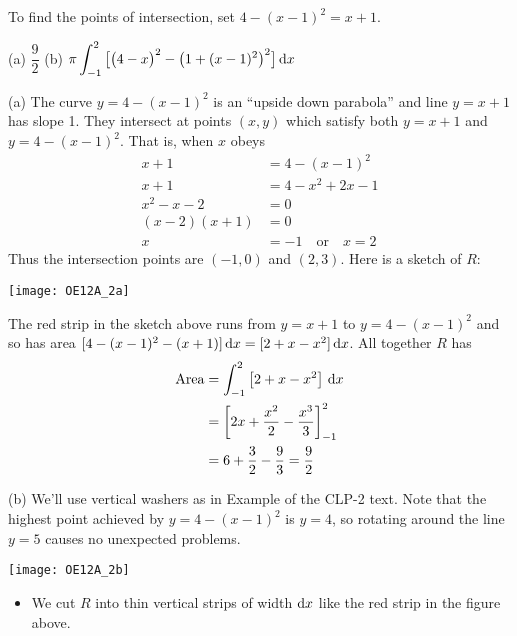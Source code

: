 \begin{hint}
To find the points of intersection, set $4-(x-1)^2=x+1$.
\end{hint}

\begin{answer} (a)
$\dfrac{9}{2}$
\qquad(b)
$
\pi\displaystyle\int_{-1}^2
   \big[{\big(4-x\big)}^2-{\big(1+(x-1)^2\big)}^2\big]\,\mathrm{d}x
$
\end{answer}

\begin{solution} (a)
The curve  $y = 4 - (x - 1)^2$ is an ``upside down parabola''
and line $y = x + 1$ has slope 1. They intersect at points $(x,y)$ which
satisfy both $y=x+1$ and $y=4-(x-1)^2$. That is, when $x$ obeys
\begin{align*}
x+1&=4-(x-1)^2\\
 x+1 &= 4 -x^2+2x-1\\
 x^2-x-2&=0 \\
 (x-2)(x+1)&=0\\
 x&=-1 \quad\mbox{or}\quad x=2
\end{align*}
Thus the intersection points are $(-1,0)$ and $(2,3)$.
Here is a sketch of $R$:

\begin{center}
       \texttt{[image: OE12A\_2a]}
\end{center}

The red strip in the sketch above runs from $y=x+1$  to $y=4-(x-1)^2$
and so has area $[4-(x-1)^2 -(x+1)]\,\mathrm{d}x = [2+x-x^2]\,\mathrm{d}x$.
All together $R$ has
\begin{align*}
\text{Area}
&= \int_{-1}^2 \big[2+x-x^2\big]\ \mathrm{d}x \\
&=\bigg[2x+\frac{x^2}{2}-\frac{x^3}{3}\bigg]_{-1}^2  \\
&=6+\frac{3}{2}-\frac{9}{3}=\frac{9}{2}
\end{align*}

\noindent (b)
We'll use vertical washers as in Example  
of the CLP-2 text. Note that the highest point achieved by $y=4-(x-1)^2$ is $y=4$, so rotating around the line $y=5$ causes no unexpected problems.

\begin{center}
       \texttt{[image: OE12A\_2b]}
\end{center}

 \begin{itemize}
\item We cut $R$ into thin vertical strips of width $\mathrm{d}x$ like the red
strip in the figure  above.


\end{itemize}
\end{solution}
